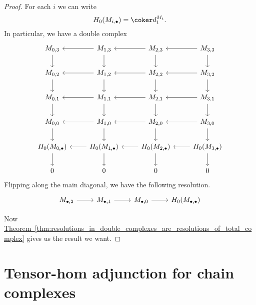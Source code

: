\documentclass[main.tex]{subfiles}
\begin{document}
\begin{proof}
  For each $i$ we can write
  \begin{equation*}
    H_{0}(M_{i, \bullet}) = \coker d^{M_{i}}_{1}.
  \end{equation*}
In particular, we have a double complex
\begin{equation*}
  \begin{tikzcd}
    M_{0,3}
    \arrow[d]
    & M_{1,3}
    \arrow[d]
    \arrow[l]
    & M_{2,3}
    \arrow[d]
    \arrow[l]
    & M_{3,3}
    \arrow[d]
    \arrow[l]
    \\
    M_{0,2}
    \arrow[d]
    & M_{1,2}
    \arrow[d]
    \arrow[l]
    & M_{2,2}
    \arrow[d]
    \arrow[l]
    & M_{3,2}
    \arrow[d]
    \arrow[l]
    \\
    M_{0,1}
    \arrow[d]
    & M_{1,1}
    \arrow[d]
    \arrow[l]
    & M_{2,1}
    \arrow[d]
    \arrow[l]
    & M_{3,1}
    \arrow[d]
    \arrow[l]
    \\
    M_{0,0}
    \arrow[d]
    & M_{1,0}
    \arrow[l]
    \arrow[d]
    & M_{2,0}
    \arrow[l]
    \arrow[d]
    & M_{3,0}
    \arrow[l]
    \arrow[d]
    \\
    H_{0}(M_{0,\bullet})
    \arrow[d]
    & H_{0}(M_{1,\bullet})
    \arrow[d]
    \arrow[l]
    & H_{0}(M_{2,\bullet})
    \arrow[d]
    \arrow[l]
    & H_{0}(M_{3,\bullet})
    \arrow[l]
    \arrow[d]
    \\
    0
    & 0
    & 0
    & 0
  \end{tikzcd}
\end{equation*}
  Flipping along the main diagonal, we have the following resolution.
  \begin{equation*}
    \begin{tikzcd}
      M_{\bullet, 2}
      \arrow[r]
      & M_{\bullet, 1}
      \arrow[r]
      & M_{\bullet, 0}
      \arrow[r]
      & H_{0}(M_{\bullet, \bullet})
    \end{tikzcd}
  \end{equation*}

  Now \hyperref[thm:resolutions_in_double_complexes_are_resolutions_of_total_complex]{Theorem~\ref*{thm:resolutions_in_double_complexes_are_resolutions_of_total_complex}} gives us the result we want.
\end{proof}

\section{Tensor-hom adjunction for chain complexes}
\label{sec:tensor_hom_adjunction_for_chain_complexes}
\end{document}
